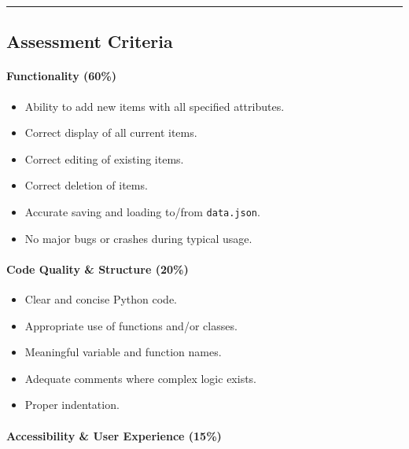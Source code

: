 \documentclass[
  justified,
  openright,
]{tufte-book}
\let\subsubsection\paragraph
\let\paragraph\paragraph
\let\subsubsection\paragraph
\let\paragraph\paragraph
\providecommand{\tightlist}{%
  \setlength{\itemsep}{0pt}\setlength{\parskip}{0pt}}
\begin{document}
\begin{center}\rule{0.5\linewidth}{0.5pt}\end{center}

\subsection{Assessment Criteria}\label{assessment-criteria}

\subsubsection{Functionality (60\%)}\label{functionality-60}

\begin{itemize}
\tightlist
\item[$\square$]
  Ability to add new items with all specified attributes.
\item[$\square$]
  Correct display of all current items.
\item[$\square$]
  Correct editing of existing items.
\item[$\square$]
  Correct deletion of items.
\item[$\square$]
  Accurate saving and loading to/from \texttt{data.json}.
\item[$\square$]
  No major bugs or crashes during typical usage.
\end{itemize}

\subsubsection{Code Quality \& Structure
(20\%)}\label{code-quality-structure-20}

\begin{itemize}
\tightlist
\item[$\square$]
  Clear and concise Python code.
\item[$\square$]
  Appropriate use of functions and/or classes.
\item[$\square$]
  Meaningful variable and function names.
\item[$\square$]
  Adequate comments where complex logic exists.
\item[$\square$]
  Proper indentation.
\end{itemize}

\subsubsection{Accessibility \& User Experience
(15\%)}\label{accessibility-user-experience-15}
\end{document}
